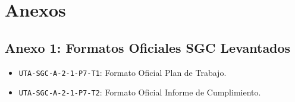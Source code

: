 \documentclass[12pt,a4paper]{article}
\begin{document}
\vspace{0.4cm}

\section{Anexos}
\subsection*{Anexo 1: Formatos Oficiales SGC Levantados}
\begin{itemize}[leftmargin=1.5em, itemsep=1.5pt]
    \item \texttt{UTA-SGC-A-2-1-P7-T1}: Formato Oficial Plan de Trabajo.
    \item \texttt{UTA-SGC-A-2-1-P7-T2}: Formato Oficial Informe de Cumplimiento.
\end{itemize}
\end{document}
